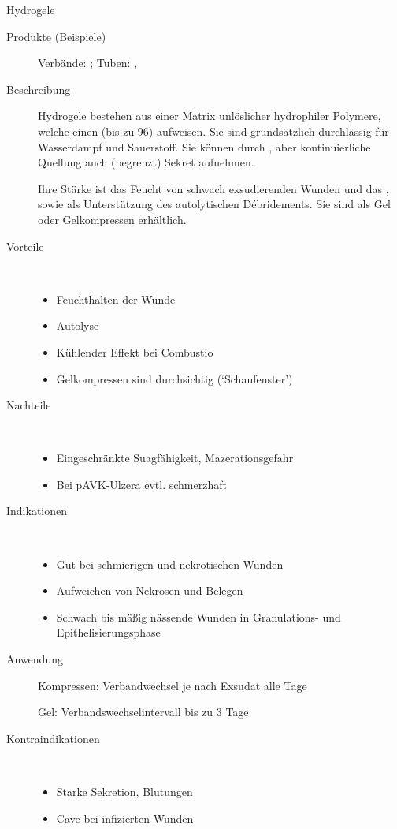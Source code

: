 \TextSlide
{Hydrogele}
{
\begin{description}
  \item[Produkte (Beispiele)] Verbände: ; Tuben: , 
  \item[Beschreibung] Hydrogele bestehen aus einer Matrix
  unlöslicher hydrophiler Polymere, welche einen  (bis zu 96\PC*) aufweisen. Sie sind
  grundsätzlich durchlässig für Wasserdampf und Sauerstoff.
  Sie können durch , aber kontinuierliche Quellung
  auch (begrenzt) Sekret aufnehmen.
  
  Ihre Stärke ist das Feucht von schwach
  exsudierenden Wunden und das , sowie als Unterstützung des autolytischen
  Débridements.
  Sie sind als Gel oder Gelkompressen erhältlich. 
  \item[Vorteile] ~
  \begin{itemize}
    \item[$+$] Feuchthalten der Wunde
    \item[$+$] Autolyse
    \item[$+$] Kühlender Effekt bei Combustio
    \textdegree
    \item[$+$] Gelkompressen sind durchsichtig
    (\enquote*{Schaufenster})
  \end{itemize}
  \item[Nachteile] ~
  \begin{itemize}
    \item[$-$] Eingeschränkte Suagfähigkeit,
    Mazerationsgefahr
    \item[$-$] Bei pAVK-Ulzera evtl. schmerzhaft
  \end{itemize}
  \item[Indikationen]~
  \begin{itemize}
    \item Gut bei schmierigen und nekrotischen Wunden
    \item Aufweichen von Nekrosen und Belegen
    \item Schwach bis mäßig nässende Wunden in Granulations-
    und Epithelisierungsphase
  \end{itemize}
  \item[Anwendung] Kompressen: Verbandwechsel je nach
  Exsudat alle  Tage
  
  Gel: Verbandswechselintervall bis zu 3 Tage 
  \item[Kontraindikationen] ~
  \begin{itemize}
    \item Starke Sekretion, Blutungen
    \item Cave bei infizierten Wunden
  \end{itemize}
\end{description}
}
